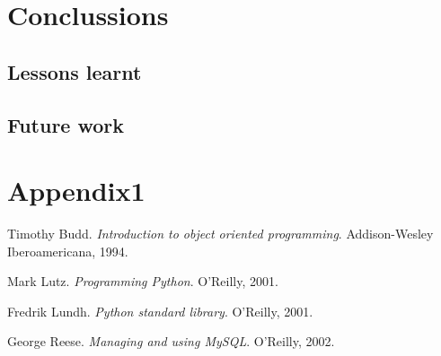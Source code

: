 \documentclass[a4paper, 12pt]{book}
\begin{document}
\chapter{Conclussions}
\label{chap:conclussions}


\section{Lessons learnt}
\label{sec:lessons}


\section{Future work}
\label{sec:future}



\appendix
\chapter{Appendix1}
\label{app:primer}



\begin{thebibliography}{25}


 Timothy Budd. \textit{Introduction to object oriented 
programming}. Addison-Wesley Iberoamericana, 1994.

 Mark Lutz. \textit{Programming Python}. O'Reilly, 2001.

 Fredrik Lundh. \textit{Python standard library}. O'Reilly,
2001.

 George Reese. \textit{Managing and using MySQL}. O'Reilly,
2002.

\end{thebibliography}
\end{document}
